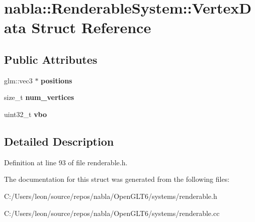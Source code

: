 \hypertarget{structnabla_1_1_renderable_system_1_1_vertex_data}{}\section{nabla\+::Renderable\+System\+::Vertex\+Data Struct Reference}
\label{structnabla_1_1_renderable_system_1_1_vertex_data}
\subsection*{Public Attributes}
\begin{DoxyCompactItemize}
\item 
\mbox{\label{structnabla_1_1_renderable_system_1_1_vertex_data_ac5452585112ddddf808eef1e7843574c}} 
glm\+::vec3 $\ast$ {\bfseries positions}
\item 
\mbox{\label{structnabla_1_1_renderable_system_1_1_vertex_data_a85dda1d7f465521c9e5d75ba476671cc}} 
size\+\_\+t {\bfseries num\+\_\+vertices}
\item 
\mbox{\label{structnabla_1_1_renderable_system_1_1_vertex_data_a5028e5a9b241070c527f924bb38cbdd0}} 
uint32\+\_\+t {\bfseries vbo}
\end{DoxyCompactItemize}


\subsection{Detailed Description}


Definition at line 93 of file renderable.\+h.



The documentation for this struct was generated from the following files\+:\begin{DoxyCompactItemize}
\item 
C\+:/\+Users/leon/source/repos/nabla/\+Open\+G\+L\+T6/systems/renderable.\+h\item 
C\+:/\+Users/leon/source/repos/nabla/\+Open\+G\+L\+T6/systems/renderable.\+cc\end{DoxyCompactItemize}
